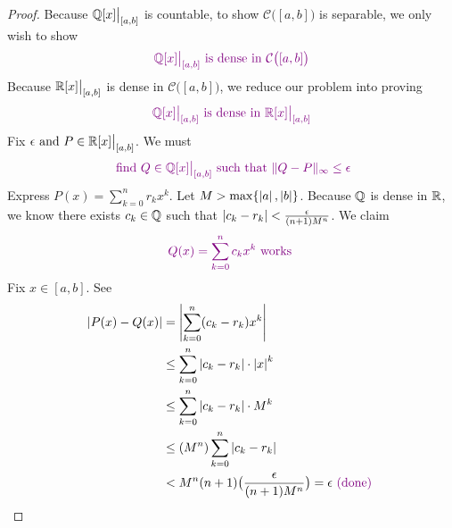 \documentclass{report}
\begin{document}
\begin{proof}
Because $\mathbb{Q}[x]\big|_{[a,b]}$ is countable, to show $\mathcal{C}\big([a,b] \big)$ is separable, we only wish to show 
\begin{align*}
\textcolor{violet}{\mathbb{Q} [x]\big|_{[a,b]}\text{ is dense in }\mathcal{C}\big([a,b] \big)}
\end{align*}
Because $\mathbb{R}[x]\big|_{[a,b]}$ is dense in $\mathcal{C}\big([a,b] \big)$, we reduce our problem into proving 
\begin{align*}
\textcolor{violet}{\mathbb{Q}[x]\big|_{[a,b]}\text{ is dense in }\mathbb{R}[x]\big|_{[a,b]}}
\end{align*}
Fix $\epsilon \text{ and } P \in \mathbb{R}[x]\big|_{[a,b]}$. We must
\begin{align*}
\textcolor{violet}{\text{ find $Q \in \mathbb{Q}[x]\big|_{[a,b]}$ such that $\| Q-P \|_\infty \leq \epsilon $}}
\end{align*}
Express $P(x)=\sum_{k=0}^n r_kx^k$. Let $M> \max \{ \left|a\right|,\left|b\right| \}$. Because $\mathbb{Q}$ is dense in $\mathbb{R}$, we know there exists $c_k \in\mathbb{Q}$ such that  $\left|c_k-r_k\right|< \frac{\epsilon }{(n+1)M^n}$. We claim 
\begin{align*}
\textcolor{violet}{Q(x)=\sum_{k=0}^n c_kx^k\text{ works }}
\end{align*}
Fix $x \in [a,b]$. See
\begin{align*}
\left|P(x)-Q(x)\right|&=\left|\sum_{k=0}^n (c_k-r_k)x^k\right|\\
&\leq \sum_{k=0}^n \left|c_k-r_k\right|\cdot \left|x\right|^k\\
&\leq \sum_{k=0}^n \left|c_k-r_k\right|\cdot M^k\\
&\leq (M^n)\sum_{k=0}^n \left|c_k-r_k\right|\\
&< M^n (n+1)\big( \frac{\epsilon }{(n+1)M^n}\big)=\epsilon \textcolor{violet}{\text{ (done) }}
\end{align*}
\end{proof}
\end{document}
